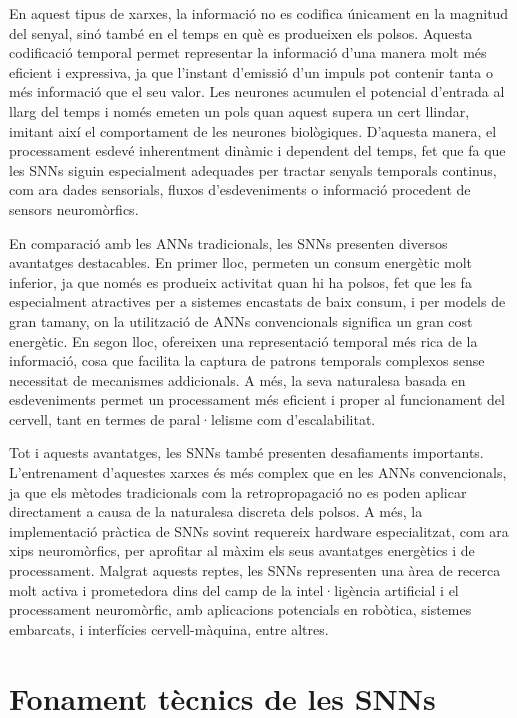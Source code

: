 \documentclass[a4paper,11pt, titlepage, twoside]{article}
\begin{document}
En aquest tipus de xarxes, la informació no es codifica únicament en la magnitud del senyal, sinó també en el temps en què es produeixen els polsos. Aquesta codificació temporal permet representar la informació d'una manera molt més eficient i expressiva, ja que l'instant d'emissió d'un impuls pot contenir tanta o més informació que el seu valor. Les neurones acumulen el potencial d'entrada al llarg del temps i només emeten un pols quan aquest supera un cert llindar, imitant així el comportament de les neurones biològiques. D'aquesta manera, el processament esdevé inherentment dinàmic i dependent del temps, fet que fa que les SNNs siguin especialment adequades per tractar senyals temporals continus, com ara dades sensorials, fluxos d'esdeveniments o informació procedent de sensors neuromòrfics.

En comparació amb les ANNs tradicionals, les SNNs presenten diversos avantatges destacables. En primer lloc, permeten un consum energètic molt inferior, ja que només es produeix activitat quan hi ha polsos, fet que les fa especialment atractives per a sistemes encastats de baix consum, i per models de gran tamany, on la utilització de ANNs convencionals significa un gran cost energètic. En segon lloc, ofereixen una representació temporal més rica de la informació, cosa que facilita la captura de patrons temporals complexos sense necessitat de mecanismes addicionals. A més, la seva naturalesa basada en esdeveniments permet un processament més eficient i proper al funcionament del cervell, tant en termes de paral·lelisme com d'escalabilitat.

Tot i aquests avantatges, les SNNs també presenten desafiaments importants. L'entrenament d'aquestes xarxes és més complex que en les ANNs convencionals, ja que els mètodes tradicionals com la retropropagació no es poden aplicar directament a causa de la naturalesa discreta dels polsos. A més, la implementació pràctica de SNNs sovint requereix hardware especialitzat, com ara xips neuromòrfics, per aprofitar al màxim els seus avantatges energètics i de processament.
Malgrat aquests reptes, les SNNs representen una àrea de recerca molt activa i prometedora dins del camp de la intel·ligència artificial i el processament neuromòrfic, amb aplicacions potencials en robòtica, sistemes embarcats, i interfícies cervell-màquina, entre altres.
\section{Fonament tècnics de les SNNs}
\end{document}
